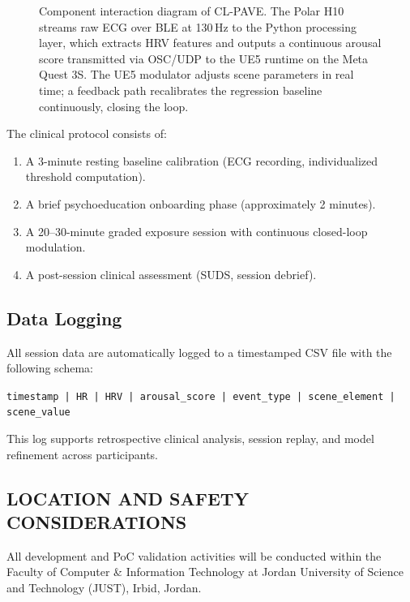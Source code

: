 \documentclass[conference]{IEEEtran}
\begin{document}
\begin{figure}[h!]
\caption{Component interaction diagram of CL-PAVE. The Polar H10 streams raw ECG over BLE at 130\,Hz to the Python processing layer, which extracts HRV features and outputs a continuous arousal score transmitted via OSC/UDP to the UE5 runtime on the Meta Quest 3S. The UE5 modulator adjusts scene parameters in real time; a feedback path recalibrates the regression baseline continuously, closing the loop.}
\label{fig:components}
\end{figure}

The clinical protocol consists of:
\begin{enumerate}
    \item A 3-minute resting baseline calibration (ECG recording, individualized threshold computation).
    \item A brief psychoeducation onboarding phase (approximately 2 minutes).
    \item A 20--30-minute graded exposure session with continuous closed-loop modulation.
    \item A post-session clinical assessment (SUDS, session debrief).
\end{enumerate}

\subsection{Data Logging}

All session data are automatically logged to a timestamped CSV file with the following schema:

\begin{center}
\texttt{timestamp | HR | HRV | arousal\_score | event\_type | scene\_element | scene\_value}
\end{center}

This log supports retrospective clinical analysis, session replay, and model refinement across participants.

\subsection{LOCATION AND SAFETY CONSIDERATIONS}

All development and PoC validation activities will be conducted within the Faculty of Computer \& Information Technology at Jordan University of Science and Technology (JUST), Irbid, Jordan.
\end{document}
